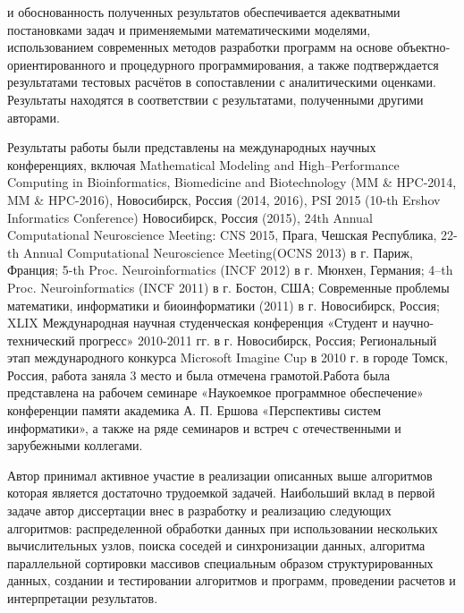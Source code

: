 {\reliability} и обоснованность полученных результатов обеспечивается адекватными постановками задач и применяемыми математическими моделями, использованием современных методов разработки программ на основе объектно­ ориентированного и проце­дурного программирования, а также подтверждается результатами тестовых расчётов в сопоставлении с аналитическими оценками. Результаты находятся в соответствии с результатами, полученными другими авторами.

{\probation}
Результаты работы были представлены на международных научных конференциях, включая Mathematical Modeling and High--Performance Computing in Bioinformatics, Biomedicine and Biotechnology (MM \& HPC-2014, MM \& HPC-2016), Новосибирск, Россия (2014, 2016), PSI 2015 (10-th Ershov Informatics Conference) Новосибирск, Россия (2015), 24th Annual Computational Neuroscience Meeting: CNS 2015, Прага, Чешская Республика, 22-th Annual Computational Neuroscience Meeting(OCNS 2013) в г. Париж, Франция; 5-th Proc. Neuroinformatics (INCF 2012) в г. Мюнхен, Германия; 4--th Proc. Neuroinformatics (INCF 2011) в г. Бостон, США; Современные проблемы математики, информатики и биоинформатики (2011) в г. Новосибирск, Россия; XLIX Международная научная студенческая конференция
«Студент и научно-технический прогресс» 2010-2011 гг. в г. Новосибирск, Россия; Региональный этап международного конкурса Microsoft Imagine Cup в 2010 г. в городе Томск, Россия, работа заняла 3 место и была отмечена грамотой.Работа была представлена на рабочем семинаре «Наукоемкое программное обеспечение» конференции памяти академика А. П. Ершова «Перспективы систем информатики»,  а также на ряде семинаров и встреч с отечественными и зарубежными коллегами.

{\contribution} Автор принимал активное участие в реализации описанных выше алгоритмов которая является достаточно трудоемкой задачей. Наибольший вклад в первой задаче автор диссертации внес в разработку и реализацию следующих алгоритмов: распределенной обработки данных при использовании нескольких вычислительных узлов, поиска соседей и синхронизации данных, алгоритма параллельной сортировки массивов специальным образом структурированных данных, создании и тестировании алгоритмов и программ, проведении расчетов и интерпретации результатов.

